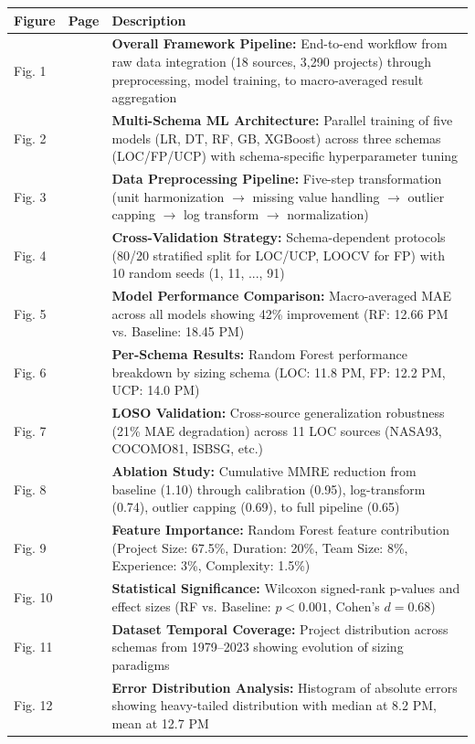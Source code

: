 \documentclass[11pt,a4paper]{article}
\begin{document}
\noindent
\begin{tabular}{|p{}|p{}|p{}|}
\hline
\rowcolor{gray!30}
\textbf{Figure} & \textbf{Page} & \textbf{Description} \\
\hline
Fig. 1 & \pageref{fig:pipeline} & \textbf{Overall Framework Pipeline:} End-to-end workflow from raw data integration (18 sources, 3,290 projects) through preprocessing, model training, to macro-averaged result aggregation \\
\hline
Fig. 2 & \pageref{fig:ml-arch} & \textbf{Multi-Schema ML Architecture:} Parallel training of five models (LR, DT, RF, GB, XGBoost) across three schemas (LOC/FP/UCP) with schema-specific hyperparameter tuning \\
\hline
Fig. 3 & \pageref{fig:preprocess} & \textbf{Data Preprocessing Pipeline:} Five-step transformation (unit harmonization $\to$ missing value handling $\to$ outlier capping $\to$ log transform $\to$ normalization) \\
\hline
Fig. 4 & \pageref{fig:cv-strategy} & \textbf{Cross-Validation Strategy:} Schema-dependent protocols (80/20 stratified split for LOC/UCP, LOOCV for FP) with 10 random seeds (1, 11, ..., 91) \\
\hline
Fig. 5 & \pageref{fig:performance} & \textbf{Model Performance Comparison:} Macro-averaged MAE across all models showing 42\% improvement (RF: 12.66 PM vs. Baseline: 18.45 PM) \\
\hline
Fig. 6 & \pageref{fig:per-schema} & \textbf{Per-Schema Results:} Random Forest performance breakdown by sizing schema (LOC: 11.8 PM, FP: 12.2 PM, UCP: 14.0 PM) \\
\hline
Fig. 7 & \pageref{fig:loso} & \textbf{LOSO Validation:} Cross-source generalization robustness (21\% MAE degradation) across 11 LOC sources (NASA93, COCOMO81, ISBSG, etc.) \\
\hline
Fig. 8 & \pageref{fig:ablation} & \textbf{Ablation Study:} Cumulative MMRE reduction from baseline (1.10) through calibration (0.95), log-transform (0.74), outlier capping (0.69), to full pipeline (0.65) \\
\hline
Fig. 9 & \pageref{fig:feature-importance} & \textbf{Feature Importance:} Random Forest feature contribution (Project Size: 67.5\%, Duration: 20\%, Team Size: 8\%, Experience: 3\%, Complexity: 1.5\%) \\
\hline
Fig. 10 & \pageref{fig:statistical-sig} & \textbf{Statistical Significance:} Wilcoxon signed-rank p-values and effect sizes (RF vs. Baseline: $p < 0.001$, Cohen's $d = 0.68$) \\
\hline
Fig. 11 & \pageref{fig:dataset-timeline} & \textbf{Dataset Temporal Coverage:} Project distribution across schemas from 1979--2023 showing evolution of sizing paradigms \\
\hline
Fig. 12 & \pageref{fig:error-distribution} & \textbf{Error Distribution Analysis:} Histogram of absolute errors showing heavy-tailed distribution with median at 8.2 PM, mean at 12.7 PM \\
\hline
\end{tabular}
\end{document}
